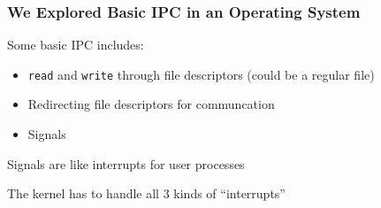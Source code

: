   \begin{frame}
    \frametitle{We Explored Basic IPC in an Operating System}

    Some basic IPC includes:
    \begin{itemize}
      \item \texttt{read} and \texttt{write} through file descriptors (could be a regular file)
      \item Redirecting file descriptors for communcation
      \item Signals
    \end{itemize}

    \vspace{2em}

    Signals are like interrupts for user processes

    \hspace{2em} The kernel has to handle all 3 kinds of ``interrupts''
  \end{frame}

